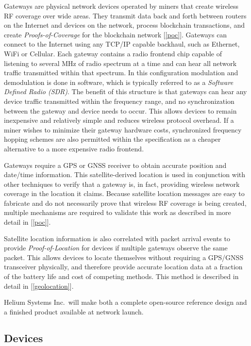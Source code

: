 \documentclass[10pt, nonatbib, nocopyrightspace, reprint]{sigplanconf}
\newcommand{\secref}[1]{[\autoref{#1}]}
\begin{document}
Gateways are physical network devices operated by miners that create wireless RF coverage over wide areas. They transmit data back and forth between routers on the Internet and devices on the network, process blockchain transactions, and create \emph{Proofs-of-Coverage} for the blockchain network \secref{poc}. Gateways can connect to the Internet using any TCP/IP capable backhaul, such as Ethernet, WiFi or Cellular. Each gateway contains a radio frontend chip capable of listening to several MHz of radio spectrum at a time and can hear all network traffic transmitted within that spectrum. In this configuration modulation and demodulation is done in software, which is typically referred to as a \emph{Software Defined Radio (SDR)}. The benefit of this structure is that gateways can hear any device traffic transmitted within the frequency range, and no synchronization between the gateway and device needs to occur. This allows devices to remain inexpensive and relatively simple and reduces wireless protocol overhead. If a miner wishes to minimize their gateway hardware costs, synchronized frequency hopping schemes are also permitted within the specification as a cheaper alternative to a more expensive radio frontend.

Gateways require a GPS or GNSS receiver to obtain accurate position and date/time information. This satellite-derived location is used in conjunction with other techniques to verify that a gateway is, in fact, providing wireless network coverage in the location it claims. Because satellite location messages are easy to fabricate and do not necessarily prove that wireless RF coverage is being created, multiple mechanisms are required to validate this work as described in more detail in \secref{poc}.

Satellite location information is also correlated with packet arrival events to provide \emph{Proof-of-Location} for devices if multiple gateways observe the same packet. This allows devices to locate themselves without requiring a GPS/GNSS transceiver physically, and therefore provide accurate location data at a fraction of the battery life and cost of competing methods. This method is described in detail in \secref{geolocation}.

Helium Systems Inc.\ will make both a complete open-source reference design and a finished product available at network launch.

\subsection{Devices}\label{devices}
\end{document}
